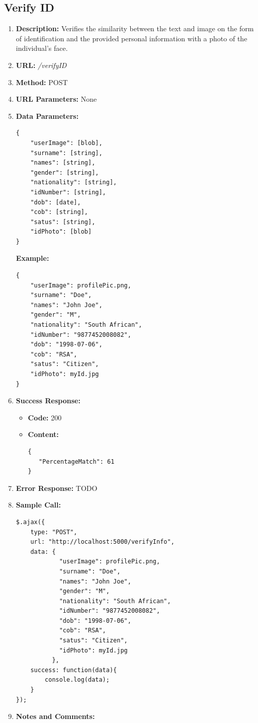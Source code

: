 \documentclass{article}
\begin{document}
\subsection{Verify ID}
\begin{enumerate}
	\item \textbf{Description:} Verifies the similarity between the text and image on the form of identification and the provided personal information with a photo of the individual's face.
	\item \textbf{URL:} \textit{/verifyID}
	\item \textbf{Method:} POST
	\item \textbf{URL Parameters:} None
	\item \textbf{Data Parameters:}

	\begin{lstlisting}
{
    "userImage": [blob],
    "surname": [string],
    "names": [string],
    "gender": [string],
    "nationality": [string],
    "idNumber": [string],
    "dob": [date],
    "cob": [string],
    "satus": [string],
    "idPhoto": [blob]
}
	\end{lstlisting}

	\textbf{Example:}

	\begin{lstlisting}
{   
    "userImage": profilePic.png,
    "surname": "Doe",
    "names": "John Joe",
    "gender": "M",
    "nationality": "South African",
    "idNumber": "9877452008082",
    "dob": "1998-07-06",
    "cob": "RSA",
    "satus": "Citizen",
    "idPhoto": myId.jpg
}
	\end{lstlisting}
	
	\item \textbf{Success Response:} 
		\begin{itemize}
			\item \textbf{Code:} 200
			\item \textbf{Content:}
			\begin{lstlisting}
{
   "PercentageMatch": 61
}
			\end{lstlisting}
		\end{itemize}
		\item \textbf{Error Response:} TODO
		\item \textbf{Sample Call:}
		\begin{lstlisting}
$.ajax({
    type: "POST",
    url: "http://localhost:5000/verifyInfo",
    data: {
            "userImage": profilePic.png,
            "surname": "Doe",
            "names": "John Joe",
            "gender": "M",
            "nationality": "South African",
            "idNumber": "9877452008082",
            "dob": "1998-07-06",
            "cob": "RSA",
            "satus": "Citizen",
            "idPhoto": myId.jpg
          },
    success: function(data){
        console.log(data);
    }
});
		\end{lstlisting}
		\item \textbf{Notes and Comments:}
\end{enumerate}
\end{document}
